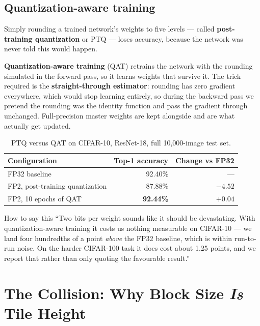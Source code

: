 \documentclass[11pt,a4paper]{report}
\newcommand{\jargon}[1]{\textcolor{acc}{\textbf{#1}}}
\begin{document}
\section{Quantization-aware training}

Simply rounding a trained network's weights to five levels --- called
\jargon{post-training quantization} or PTQ --- loses accuracy, because the
network was never told this would happen.

\jargon{Quantization-aware training} (QAT) retrains the network with the
rounding simulated in the forward pass, so it learns weights that survive it.
The trick required is the \jargon{straight-through estimator}: rounding has
zero gradient everywhere, which would stop learning entirely, so during the
backward pass we pretend the rounding was the identity function and pass the
gradient through unchanged. Full-precision master weights are kept alongside
and are what actually get updated.

\begin{table}[h]
\centering
\caption{PTQ versus QAT on CIFAR-10, ResNet-18, full 10{,}000-image test set.}
\begin{tabular}{lrr}
\toprule
Configuration & Top-1 accuracy & Change vs FP32 \\
\midrule
FP32 baseline & 92.40\% & --- \\
FP2, post-training quantization & 87.88\% & $-4.52$ \\
FP2, 10 epochs of QAT & \textbf{92.44\%} & $\mathbf{+0.04}$ \\
\bottomrule
\end{tabular}
\end{table}

\begin{saybox}{How to say this}
``Two bits per weight sounds like it should be devastating. With
quantization-aware training it costs us nothing measurable on CIFAR-10 --- we
land four hundredths of a point \emph{above} the FP32 baseline, which is
within run-to-run noise. On the harder CIFAR-100 task it does cost about
1.25 points, and we report that rather than only quoting the favourable
result.''
\end{saybox}

\chapter{The Collision: Why Block Size \emph{Is} Tile Height}
\end{document}
